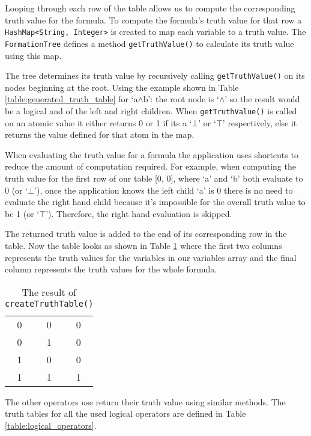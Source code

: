 \documentclass{report}
\begin{document}
Looping through each row of the table allows us to compute the corresponding truth value for the formula. To compute the formula's truth value for that row a {\tt HashMap<String, Integer>} is created to map each variable to a truth value. The {\tt FormationTree} defines a method {\tt getTruthValue()} to calculate its truth value using this map.

The tree determines its truth value by recursively calling {\tt getTruthValue()} on its nodes beginning at the root. Using the example shown in Table \ref{table:generated_truth_table} for `a$\land$b': the root node is `$\land$' so the result would be a logical and of the left and right children. When {\tt getTruthValue()} is called on an atomic value it either returns 0 or 1 if its a `$\bot$' or `$\top$' respectively, else it returns the value defined for that atom in the map.

When evaluating the truth value for a formula the application uses shortcuts to reduce the amount of computation required. For example, when computing the truth value for the first row of our table [0, 0], where `a' and `b' both evaluate to 0 (or `$\bot$'), once the application knows the left child `a' is 0 there is no need to evaluate the right hand child because it's impossible for the overall truth value to be 1 (or `$\top$'). Therefore, the right hand evaluation is skipped.

The returned truth value is added to the end of its corresponding row in the table. Now the table looks as shown in Table \ref{table:final_generated_table} where the first two columns represents the truth values for the variables in our variables array and the final column represents the truth values for the whole formula.

\begin{table}[h]
  \begin{center}
    \begin{tabular}{ || c | c || c || }
      \hline
      0 & 0 & 0 \\
      0 & 1 & 0 \\
      1 & 0 & 0 \\
      1 & 1 & 1 \\
      \hline
    \end{tabular}
  \end{center}
  \caption{The result of {\tt createTruthTable()}}
  \label{table:final_generated_table}
\end{table}

The other operators use return their truth value using similar methods. The truth tables for all the used logical operators are defined in Table \ref{table:logical_operators}.
\end{document}
